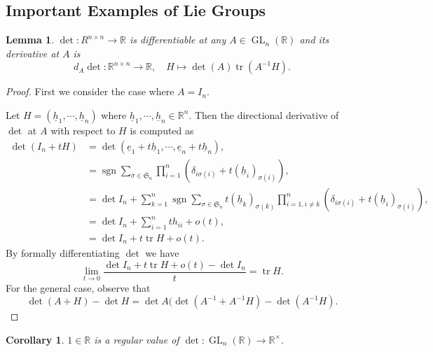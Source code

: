 \documentclass{article}
\newtheorem{lemma}{Lemma}[section]
\newtheorem{corollary}{Corollary}[section]
\numberwithin{equation}{section}
\DeclareMathOperator{\sgn}{sgn}
\DeclareMathOperator{\GL}{GL}
\DeclareMathOperator{\tr}{tr}
\begin{document}
\subsection{Important Examples of Lie Groups}



\begin{lemma}
$\det:R^{n\times n}\to \mathbb{R}$ is differentiable at any $A\in\GL_n(\mathbb{R})$ and its derivative at $A$ is
\begin{equation*}
d_A\det:\mathbb{R}^{n\times n}\to\mathbb{R},\quad H\mapsto \det(A)\tr(A^{-1}H).
\end{equation*}
\end{lemma}

\begin{proof}
First we consider the case where $A=I_n$. \\
\par Let $H = (\underline{h}_1,\cdots,\underline{h}_n)$ where $\underline{h}_1,\cdots,\underline{h}_n\in\mathbb{R}^n$. Then the directional derivative of $\det$ at $A$ with respect to $H$ is computed as 
\begin{align*}
\det(I_n+tH) &= \det(\underline{e}_1+t\underline{h}_1,\cdots,\underline{e}_n+t\underline{h}_n),\\
& = \sgn\sum_{\sigma\in\mathfrak{S}_n}\prod_{i=1}^n(\delta_{i\sigma(i)}+t(\underline{h}_i)_{\sigma(i)}),\\
& = \det I_n+\sum_{k=1}^n\sgn\sum_{\sigma\in\mathfrak{S}_n}t(\underline{h}_k)_{\sigma(k)}\prod_{i=1,i\not=k}^n(\delta_{i\sigma(i)}+t(\underline{h}_i)_{\sigma(i)}),\\
& = \det I_n + \sum_{i=1}^n th_{ii}+o(t),\\
& = \det I_n+t\tr H+o(t).
\end{align*}
By formally differentiating $\det$ we have
\begin{equation*}
\lim_{t\to 0}{\frac {\det I_n + t\tr H+o(t)-\det I_n} {t}} = \tr H.
\end{equation*}
For the general case, observe that 
\begin{equation*}
\det(A+H)-\det H = \det A(\det(A^{-1}+A^{-1}H)-\det (A^{-1}H).
\end{equation*}
\end{proof}

\begin{corollary}
$1\in\mathbb{R}$ is a regular value of $\det:\GL_n(\mathbb{R})\to\mathbb{R}^\times$.
\end{corollary}
\end{document}
